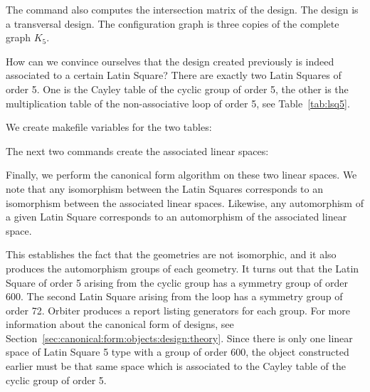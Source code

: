 
The command also computes the intersection matrix of the design. 
The design is a transversal design. 
The configuration graph is three copies of the complete graph $K_5.$


\bigskip


How can we convince ourselves that the design 
created previously is indeed associated to a certain Latin Square?
There are exactly two Latin Squares of order 5. 
One is the Cayley table of the cyclic group of order 5, 
the other is the multiplication table of the 
non-associative loop of order 5, see Table~\ref{tab:lsq5}. 



We create makefile variables for the two tables:



The next two commands create the associated linear spaces:



Finally, we perform the canonical form algorithm on these two linear spaces. 
We note that any isomorphism between 
the Latin Squares corresponds to an isomorphism 
between the associated linear spaces.  
Likewise, any automorphism of a given Latin Square 
corresponds to an automorphism of the 
associated linear space.


This establishes the fact that the geometries are not isomorphic, 
and it also produces the automorphism groups of each geometry. 
It turns out that the Latin Square of order 5 arising 
from the cyclic group has a symmetry group of order 600. 
The second Latin Square arising from the loop has a symmetry group of order 72. 
Orbiter produces a report listing generators for each group.
For more information about the canonical form of designs, 
see Section~\ref{sec:canonical:form:objects:design:theory}.
Since there is only one linear space of Latin Square 5 type with a group of order 600, 
the object constructed earlier must be that same space 
which is associated to the Cayley table of the cyclic group of order 5.


